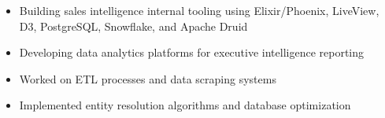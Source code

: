 \begin{itemize}[leftmargin=*, itemsep=0pt, parsep=0pt, topsep=0pt]
    \item Building sales intelligence internal tooling using Elixir/Phoenix, LiveView, D3, PostgreSQL, Snowflake, and Apache Druid
    \item Developing data analytics platforms for executive intelligence reporting
\end{itemize}
\vspace{0.2em}

\begin{itemize}[leftmargin=*, itemsep=0pt, parsep=0pt, topsep=0pt]
    \item Worked on ETL processes and data scraping systems
    \item Implemented entity resolution algorithms and database optimization
\end{itemize}
